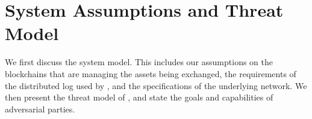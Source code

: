 

\section{System Assumptions and Threat Model}
\label{sec:system_threat_model}
We first discuss the \ModelName{} system model.
This includes our assumptions on the blockchains that are managing the assets being exchanged, the requirements of the distributed log used by \ModelName{}, and the specifications of the underlying \ModelName{} network.
We then present the threat model of \ModelName{}, and state the goals and capabilities of adversarial parties.

